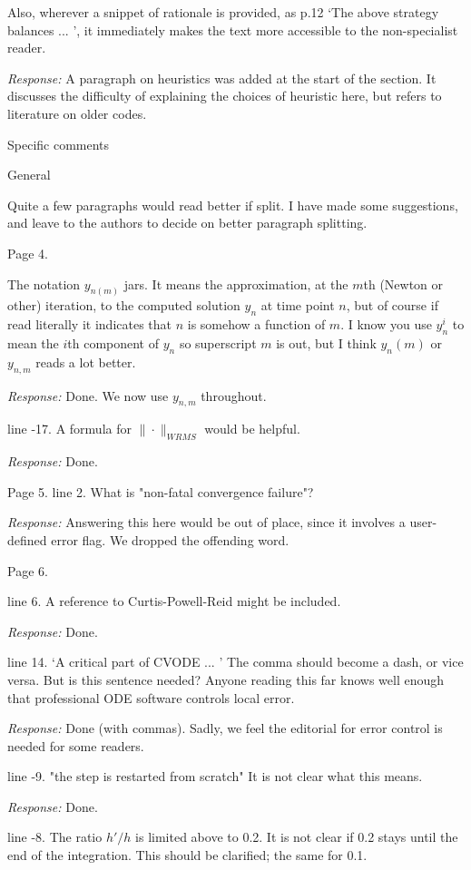 \documentclass[12pt]{letter}
\begin{document}
Also, wherever a snippet of rationale is provided, as p.12 `The above
strategy balances ... ', it immediately makes the text more accessible
to the non-specialist reader.

{\em Response:} A paragraph on heuristics was added at the start of
the section.  It discusses the difficulty of explaining the choices of
heuristic here, but refers to literature on older codes.


Specific comments 

General

Quite a few paragraphs would read better if split. I have made some
suggestions, and leave to the authors to decide on better paragraph
splitting.


Page 4. 

The notation $y_{n(m)}$ jars. It means the approximation, at the $m$th
(Newton or other) iteration, to the computed solution $y_n$ at time
point $n$, but of course if read literally it indicates that $n$ is
somehow a function of $m$.  I know you use $y^i_n$ to mean the $i$th
component of $y_n$ so superscript $m$ is out, but I think $y_n(m)$ or
$y_{n,m}$ reads a lot better.

{\em Response:} Done.  We now use $y_{n,m}$ throughout. 

line -17. A formula for $\|\cdot\|_{WRMS}$ would be helpful. 

{\em Response:} Done.

Page 5. 
line 2. What is "non-fatal convergence failure"? 

{\em Response:} Answering this here would be out of place, since it
involves a user-defined error flag.  We dropped the offending word.

Page 6.  

line 6. A reference to Curtis-Powell-Reid might be included.  

{\em Response:} Done.

line 14. `A critical part of CVODE ... ' The comma should become a
dash, or vice versa.  But is this sentence needed? Anyone reading this
far knows well enough that professional ODE software controls local error.

{\em Response:} Done (with commas).  Sadly, we feel the editorial for
error control is needed for some readers.

line -9. "the step is restarted from scratch" It is not clear what this means.

{\em Response:} Done.

line -8. The ratio $h'/h$ is limited above to 0.2. It is not clear if
0.2 stays until the end of the integration. This should be clarified;
the same for 0.1.
\end{document}
